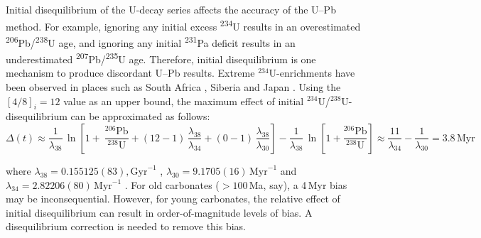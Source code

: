 \documentclass{article}
\begin{document}
Initial disequilibrium of the U-decay series affects the accuracy of
the U--Pb method. For example, ignoring any initial excess
\textsuperscript{234}U results in an overestimated
\textsuperscript{206}Pb/\textsuperscript{238}U age, and ignoring any
initial \textsuperscript{231}Pa deficit results in an underestimated
\textsuperscript{207}Pb/\textsuperscript{235}U age. Therefore, initial
disequilibrium is one mechanism to produce discordant U--Pb results.
Extreme ${}^{234}$U-enrichments have been observed in places such as
South Africa \citep[\ensuremath{[4/8]_i<12};][]{kronfeld1994}, Siberia
\citep[\ensuremath{[4/8]_i<6};][]{vaks2020} and Japan
\citep[\ensuremath{[4/8]_i<12};][]{kuribayashi2025}. Using the
$[4/8]_i=12$ value as an upper bound, the maximum effect of initial
${}^{234}$U/${}^{238}$U-disequilibrium can be approximated as follows:
\begin{equation}
  \Delta(t) \approx \frac{1}{\lambda_{38}}\,
  \ln\left[
  1+\
  \frac{{}^{206}\mbox{Pb}}{{}^{238}\mbox{U}} +
  (12-1)\,\frac{\lambda_{38}}{\lambda_{34}} +
  (0-1)\,\frac{\lambda_{38}}{\lambda_{30}}
  \right] -
  \frac{1}{\lambda_{38}}\,\ln\left[1+\frac{{}^{206}\mbox{Pb}}{{}^{238}\mbox{U}}\right] \approx
  \frac{11}{\lambda_{34}} - \frac{1}{\lambda_{30}} = 3.8\,\mbox{Myr}
    \label{eq:worst-case}
\end{equation}

\noindent where $\lambda_{38}=0.155125(83),\mbox{Gyr}^{-1}$
\citep{jaffey1971}, $\lambda_{30}=9.1705(16)\,\mbox{Myr}^{-1}$ and
$\lambda_{34}=2.82206(80)\,\mbox{Myr}^{-1}$ \citep{cheng2013}. For old
carbonates ($>100$\,Ma, say), a 4\,Myr bias may be
inconsequential. However, for young carbonates, the relative effect of
initial disequilibrium can result in order-of-magnitude levels of
bias. A disequilibrium correction is needed to remove this
bias.\medskip
\end{document}

